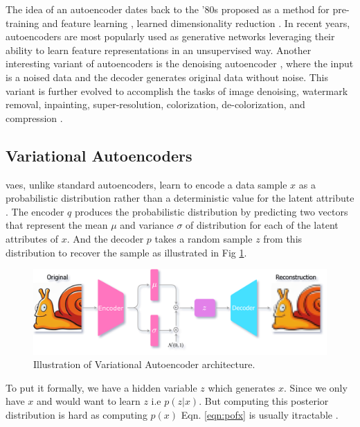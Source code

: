 The idea of an autoencoder dates back to the '80s proposed as a method for pre-training and feature learning \cite{ballard1987modular, rumelhart1985learning}, learned dimensionality reduction \cite{hinton_dimentionality}. In recent years, autoencoders are most popularly used as generative networks leveraging their ability to learn feature representations in an unsupervised way. Another interesting variant of autoencoders is the denoising autoencoder \cite{vincent2008extracting}, where the input is a noised data and the decoder generates original data without noise. This variant is further evolved to accomplish the tasks of image denoising, watermark removal, inpainting, super-resolution, colorization, de-colorization, and compression \cite{zhang2016colorful, imagedenoisingpaper,deepimageprior}. 

\subsection{Variational Autoencoders}
\label{subsec:vae}
\acp{vae}, unlike standard autoencoders, learn to encode a data sample $x$ as a probabilistic distribution rather than a deterministic value for the latent attribute \cite{jeremy_jordan_2018}. The encoder $q$ produces the probabilistic distribution by predicting two vectors that represent the mean $\mu$ and variance $\sigma$ of distribution for each of the latent attributes of $x$. And the decoder $p$ takes a random sample $z$ from this distribution to recover the sample as illustrated in Fig \ref{fig:vae_arch}.

\begin{figure}[!h]
    \centering
    \includegraphics[scale=0.2]{figures/arch/vae_arch.png}
    \caption{Illustration of Variational Autoencoder architecture.}
    \label{fig:vae_arch}
\end{figure}

To put it formally, we have a hidden variable $z$ which generates $x$. Since we only have $x$ and would want to learn $z$ i.e $p(z | x)$. But computing this posterior distribution is hard as computing $p(x)$ Eqn. \ref{eqn:pofx} is usually itractable \cite{kingma2013autoencoding}.

